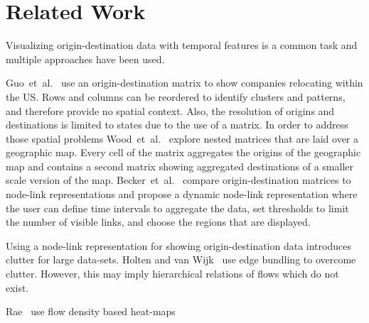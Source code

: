\documentclass[a4paper,twocolumn]{article}
\author{Josua Krause}
\begin{document}
\section*{Related Work}
Visualizing origin-destination data with temporal features
is a common task and multiple approaches have been used.

Guo~et~al.~\cite{Guo2006} use an origin-destination matrix
to show companies relocating within the US.
Rows and columns can be reordered to identify clusters
and patterns, and therefore provide no spatial context.
Also, the resolution of origins and destinations is limited
to states due to the use of a matrix.
In order to address those spatial problems
Wood~et~al.~\cite{Wood2002} explore nested matrices
that are laid over a geographic map.
Every cell of the matrix aggregates the origins
of the geographic map and contains
a second matrix showing aggregated destinations of
a smaller scale version of the map.
Becker~et~al.~\cite{Becker1995} compare
origin-destination matrices to node-link representations
and propose a dynamic node-link representation
where the user can define time intervals to aggregate the data,
set thresholds to limit the number of visible links,
and choose the regions that are displayed.

Using a node-link representation for showing origin-destination
data introduces clutter for large data-sets.
Holten and van Wijk~\cite{Holten2009} use edge bundling
to overcome clutter. However, this may imply hierarchical
relations of flows which do not exist.

Rae~\cite{Rae2009} use flow density based heat-maps






\end{document}
